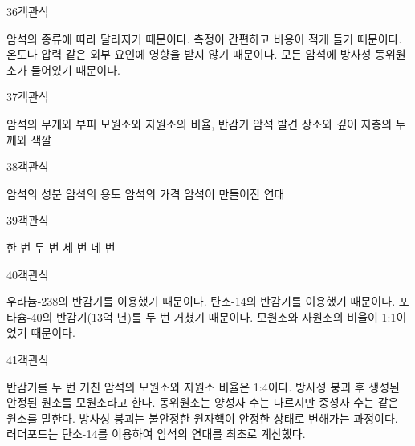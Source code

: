 \documentclass[fs9,seriesRus]{korfarm-base}
\begin{document}
\begin{kfQBlock}{36}{객관식}
\begin{kfChoices}
\kfChoice 암석의 종류에 따라 달라지기 때문이다.
\kfChoice 측정이 간편하고 비용이 적게 들기 때문이다.
\kfChoice 온도나 압력 같은 외부 요인에 영향을 받지 않기 때문이다.
\kfChoice 모든 암석에 방사성 동위원소가 들어있기 때문이다.
\end{kfChoices}
\end{kfQBlock}
\begin{kfQBlock}{37}{객관식}
\begin{kfChoices}
\kfChoice 암석의 무게와 부피
\kfChoice 모원소와 자원소의 비율, 반감기
\kfChoice 암석 발견 장소와 깊이
\kfChoice 지층의 두께와 색깔
\end{kfChoices}
\end{kfQBlock}
\begin{kfQBlock}{38}{객관식}
\begin{kfChoices}
\kfChoice 암석의 성분
\kfChoice 암석의 용도
\kfChoice 암석의 가격
\kfChoice 암석이 만들어진 연대
\end{kfChoices}
\end{kfQBlock}
\begin{kfQBlock}{39}{객관식}
\begin{kfChoices}
\kfChoice 한 번
\kfChoice 두 번
\kfChoice 세 번
\kfChoice 네 번
\end{kfChoices}
\end{kfQBlock}
\begin{kfQBlock}{40}{객관식}
\begin{kfChoices}
\kfChoice 우라늄-238의 반감기를 이용했기 때문이다.
\kfChoice 탄소-14의 반감기를 이용했기 때문이다.
\kfChoice 포타슘-40의 반감기(13억 년)를 두 번 거쳤기 때문이다.
\kfChoice 모원소와 자원소의 비율이 1:1이었기 때문이다.
\end{kfChoices}
\end{kfQBlock}
\begin{kfQBlock}{41}{객관식}
\begin{kfChoices}
\kfChoice 반감기를 두 번 거친 암석의 모원소와 자원소 비율은 1:4이다.
\kfChoice 방사성 붕괴 후 생성된 안정된 원소를 모원소라고 한다.
\kfChoice 동위원소는 양성자 수는 다르지만 중성자 수는 같은 원소를 말한다.
\kfChoice 방사성 붕괴는 불안정한 원자핵이 안정한 상태로 변해가는 과정이다.
\kfChoice 러더포드는 탄소-14를 이용하여 암석의 연대를 최초로 계산했다.
\end{kfChoices}
\end{kfQBlock}
\end{document}
